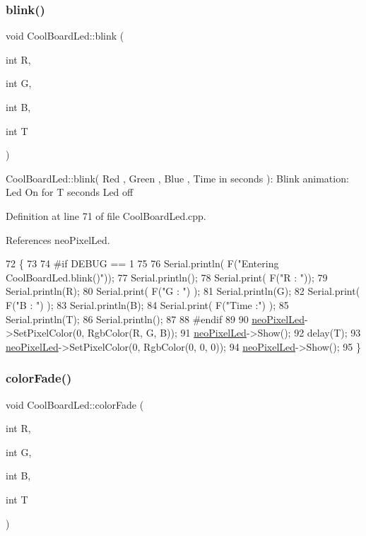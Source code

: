 \subsubsection{\texorpdfstring{blink()}{blink()}}
{\footnotesize\ttfamily void Cool\+Board\+Led\+::blink (\begin{DoxyParamCaption}\item[{int}]{R,  }\item[{int}]{G,  }\item[{int}]{B,  }\item[{int}]{T }\end{DoxyParamCaption})}

Cool\+Board\+Led\+::blink( Red , Green , Blue , Time in seconds )\+: Blink animation\+: Led On for T seconds Led off 

Definition at line 71 of file Cool\+Board\+Led.\+cpp.



References neo\+Pixel\+Led.


\begin{DoxyCode}
72 \{
73 
74 \textcolor{preprocessor}{#if DEBUG == 1}
75 
76     Serial.println( F(\textcolor{stringliteral}{"Entering CoolBoardLed.blink()"}));
77     Serial.println();
78     Serial.print( F(\textcolor{stringliteral}{"R : "}));
79     Serial.println(R);
80     Serial.print( F(\textcolor{stringliteral}{"G : "}) );
81     Serial.println(G);
82     Serial.print( F(\textcolor{stringliteral}{"B : "}) );
83     Serial.println(B);
84     Serial.print( F(\textcolor{stringliteral}{"Time :"}) );
85     Serial.println(T);
86     Serial.println();
87 
88 \textcolor{preprocessor}{#endif  }
89 
90     \hyperlink{classCoolBoardLed_ac2c13fa462a010cd9242bf297c013923}{neoPixelLed}->SetPixelColor(0, RgbColor(R, G, B));
91     \hyperlink{classCoolBoardLed_ac2c13fa462a010cd9242bf297c013923}{neoPixelLed}->Show();
92     delay(T);
93     \hyperlink{classCoolBoardLed_ac2c13fa462a010cd9242bf297c013923}{neoPixelLed}->SetPixelColor(0, RgbColor(0, 0, 0));
94     \hyperlink{classCoolBoardLed_ac2c13fa462a010cd9242bf297c013923}{neoPixelLed}->Show();
95 \}
\end{DoxyCode}
\mbox{\label{classCoolBoardLed_a6dbfe23988f43e1242cd05e69b13ff30}} 
\subsubsection{\texorpdfstring{color\+Fade()}{colorFade()}}
{\footnotesize\ttfamily void Cool\+Board\+Led\+::color\+Fade (\begin{DoxyParamCaption}\item[{int}]{R,  }\item[{int}]{G,  }\item[{int}]{B,  }\item[{int}]{T }\end{DoxyParamCaption})}

